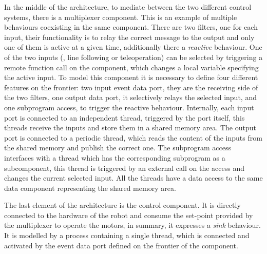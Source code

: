 In the middle of the architecture, to mediate between the two different control systems, there is a multiplexer component. This is an example of multiple behaviours coexisting in the same component. There are two filters, one for each input, their functionality is to relay the correct message to the output and only one of them is active at a given time, additionally there a \textit{reactive} behaviour. One of the two inputs (\ie, line following or teleoperation) can be selected by triggering a remote function call on the component, which changes a local variable specifying the active input. To model this component it is necessary to define four different features on the frontier: two input event data port, they are the receiving side of the two filters, one output data port, it selectively relays the selected input, and one subprogram access, to trigger the reactive behaviour. Internally, each input port is connected to an independent thread, triggered by the port itself, this threads receive the inputs and store them in a shared memory area. The output port is connected to a periodic thread, which reads the content of the inputs from the shared memory and publish the correct one. The subprogram access interfaces with a thread which has the corresponding subprogram as a subcomponent, this thread is triggered by an external call on the access and changes the current selected input. All the threads have a data access to the same data component representing the shared memory area.

The last element of the architecture is the control component. It is directly connected to the hardware of the robot and consume the set-point provided by the multiplexer to operate the motors, in summary, it expresses a \textit{sink} behaviour. It is modelled by a process containing a single thread, which is connected and activated by the event data port defined on the frontier of the component.

